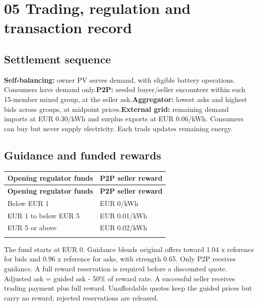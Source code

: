 \documentclass[a4paper,11pt]{article}
\begin{document}
\clearpage

\section*{05  Trading, regulation and transaction record}
\par\medskip

\subsection*{Settlement sequence}
\par\medskip

\textbf{Self-balancing:} owner PV serves demand, with eligible battery operations. Consumers have demand only.\newline{}\textbf{P2P:} seeded buyer/seller encounters within each 15-member mixed group, at the seller ask.\newline{}\textbf{Aggregator:} lowest asks and highest bids across groups, at midpoint prices.\newline{}\textbf{External grid:} remaining demand imports at EUR 0.30/kWh and surplus exports at EUR 0.06/kWh. Consumers can buy but never supply electricity. Each trade updates remaining energy.
\par\medskip

\subsection*{Guidance and funded rewards}
\par\medskip

\begingroup\small
\begin{longtable}{>{\RaggedRight\arraybackslash}p{}>{\RaggedRight\arraybackslash}p{}}
\toprule
\textbf{Opening regulator funds} & \textbf{P2P seller reward} \\ \midrule
\endfirsthead
\toprule
\textbf{Opening regulator funds} & \textbf{P2P seller reward} \\ \midrule
\endhead
Below EUR 1 & EUR 0/kWh \\ \addlinespace[3pt]
EUR 1 to below EUR 5 & EUR 0.01/kWh \\ \addlinespace[3pt]
EUR 5 or above & EUR 0.02/kWh \\ \addlinespace[3pt]
\bottomrule
\end{longtable}
\endgroup

The fund starts at EUR 0. Guidance blends original offers toward 1.04 x reference for bids and 0.96 x reference for asks, with strength 0.65. Only P2P receives guidance. A full reward reservation is required before a discounted quote. Adjusted ask = guided ask - 50\% of reward rate. A successful seller receives trading payment plus full reward. Unaffordable quotes keep the guided prices but carry no reward; rejected reservations are released.
\par\medskip
\end{document}
